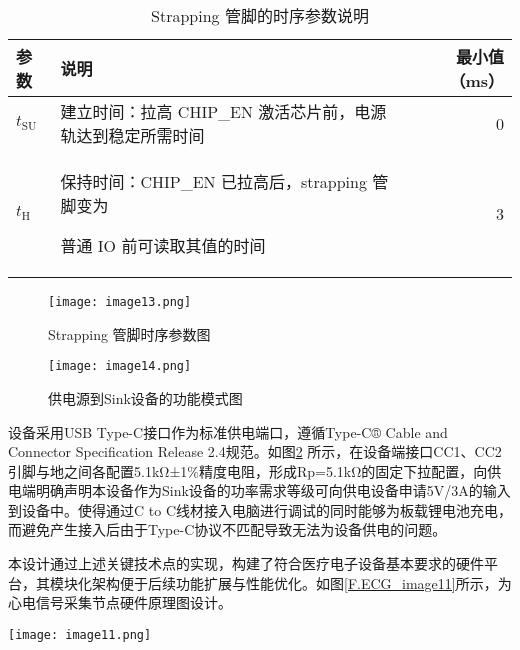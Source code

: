 \begin{table}[htb]
    \centering
    \caption{Strapping 管脚的时序参数说明}
    \label{T.ESP32C3-strapping}
    \begin{tabular}{|l| p{8cm} |r|} %
    \hline
    \textbf{参数} & \textbf{说明} & \textbf{最小值（ms）} \\
    \hline
    $t_{\mathrm{SU}}$ & 建立时间：拉高 CHIP\_EN 激活芯片前，电源轨达到稳定所需时间 & 0 \\
    \hline
    $t_{\mathrm{H}}$ & 保持时间：CHIP\_EN 已拉高后，strapping 管脚变为
    
    普通 IO 前可读取其值的时间 & 3 \\
    \hline
    \end{tabular}
\end{table}

\begin{figure}[H]
    \centering
    \texttt{[image: image13.png]}
    \caption{Strapping 管脚时序参数图}
    \label{F.ECG_image13}
\end{figure}

\begin{figure}[hbt]%
    \centering
    \texttt{[image: image14.png]}
    \caption{供电源到Sink设备的功能模式图}
    \label{F.ECG_image14}
\end{figure}

设备采用USB Type-C接口作为标准供电端口，遵循Type-C® Cable and Connector Specification Release 2.4规范。如图\ref{F.ECG_image14} \cite{usbtypec24}所示，在设备端接口CC1、CC2引脚与地之间各配置5.1kΩ±1$\%$精度电阻，形成Rp=5.1kΩ的固定下拉配置，向供电端明确声明本设备作为Sink设备的功率需求等级可向供电设备申请5V/3A的输入到设备中。使得通过C to C线材接入电脑进行调试的同时能够为板载锂电池充电，而避免产生接入后由于Type-C协议不匹配导致无法为设备供电的问题。

本设计通过上述关键技术点的实现，构建了符合医疗电子设备基本要求的硬件平台，其模块化架构便于后续功能扩展与性能优化。如图\ref{F.ECG_image11}所示，为心电信号采集节点硬件原理图设计。

\begin{sidewaysfigure}
    \centering
    \texttt{[image: image11.png]}
    \caption{心电信号采集节点主控部分硬件原理图设计}
    \label{F.ECG_image11}
\end{sidewaysfigure}

\newpage    %


